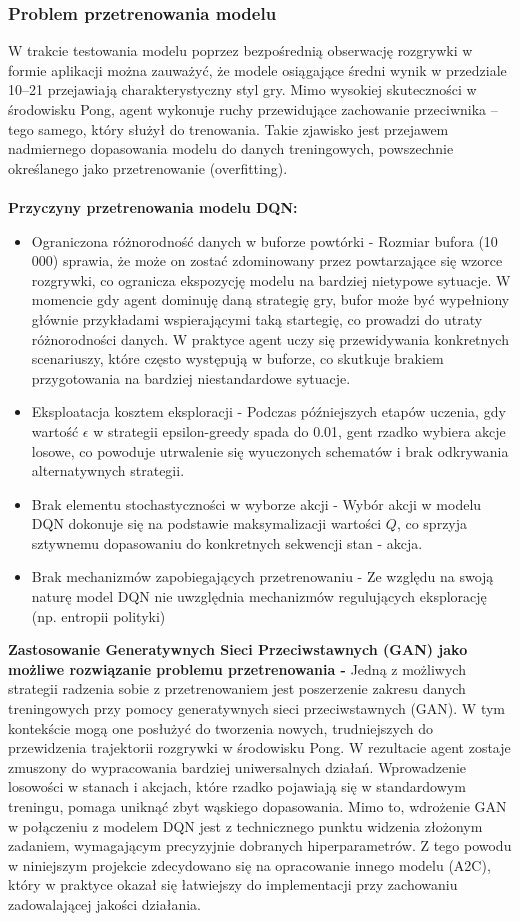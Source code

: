 \documentclass[a4paper, 12pt]{article}
\numberwithin{equation}{section}
\begin{document}
    \subsubsection{Problem przetrenowania modelu}
    W trakcie testowania modelu poprzez bezpośrednią obserwację rozgrywki w formie aplikacji można zauważyć, że modele osiągające średni wynik w przedziale 10–21 przejawiają charakterystyczny styl gry. Mimo wysokiej skuteczności w środowisku Pong, agent wykonuje ruchy przewidujące zachowanie przeciwnika – tego samego, który służył do trenowania. Takie zjawisko jest przejawem nadmiernego dopasowania modelu do danych treningowych, powszechnie określanego jako przetrenowanie (overfitting).
    \\ \\ \textbf{Przyczyny przetrenowania modelu DQN:}
    \begin{itemize}
        \item Ograniczona różnorodność danych w buforze powtórki - Rozmiar bufora (10  000) sprawia, że może on zostać zdominowany przez powtarzające się wzorce rozgrywki, co ogranicza ekspozycję modelu na bardziej nietypowe sytuacje.
        W momencie gdy agent dominuję daną strategię gry, bufor może być wypełniony głównie przykładami wspierającymi taką startegię, co prowadzi do utraty różnorodności danych.
        W praktyce agent uczy się przewidywania konkretnych scenariuszy, które często występują w buforze, co skutkuje brakiem przygotowania na bardziej niestandardowe sytuacje.
        \item Eksploatacja kosztem eksploracji - Podczas późniejszych etapów uczenia, gdy wartość \( \epsilon \) w strategii epsilon-greedy spada do 0.01, gent rzadko wybiera akcje losowe, co powoduje utrwalenie się wyuczonych schematów i brak odkrywania alternatywnych strategii.
        \item Brak elementu stochastyczności w wyborze akcji - Wybór akcji w modelu DQN dokonuje się na podstawie maksymalizacji wartości \( Q \), co sprzyja sztywnemu dopasowaniu do konkretnych sekwencji stan - akcja.
        \item Brak mechanizmów zapobiegających przetrenowaniu - Ze względu na swoją naturę model DQN nie uwzględnia mechanizmów regulujących eksplorację (np. entropii polityki)
    \end{itemize}
    \textbf{Zastosowanie Generatywnych Sieci Przeciwstawnych (GAN) jako możliwe rozwiązanie problemu przetrenowania - }
    Jedną z możliwych strategii radzenia sobie z przetrenowaniem jest poszerzenie zakresu danych treningowych przy pomocy generatywnych sieci przeciwstawnych (GAN). W tym kontekście mogą one posłużyć do tworzenia nowych, trudniejszych do przewidzenia trajektorii rozgrywki w środowisku Pong. W rezultacie agent zostaje zmuszony do wypracowania bardziej uniwersalnych działań. Wprowadzenie losowości w stanach i akcjach, które rzadko pojawiają się w standardowym treningu, pomaga uniknąć zbyt wąskiego dopasowania.
    Mimo to, wdrożenie GAN w połączeniu z modelem DQN jest z technicznego punktu widzenia złożonym zadaniem, wymagającym precyzyjnie dobranych hiperparametrów. Z tego powodu w niniejszym projekcie zdecydowano się na opracowanie innego modelu (A2C), który w praktyce okazał się łatwiejszy do implementacji przy zachowaniu zadowalającej jakości działania.
\end{document}
